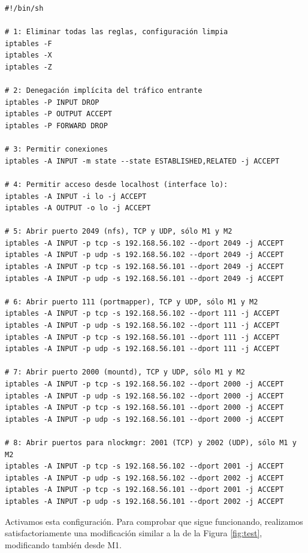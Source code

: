 \documentclass{article}
\begin{document}
\begin{Verbatim}
#!/bin/sh

# 1: Eliminar todas las reglas, configuración limpia
iptables -F
iptables -X
iptables -Z

# 2: Denegación implícita del tráfico entrante
iptables -P INPUT DROP
iptables -P OUTPUT ACCEPT
iptables -P FORWARD DROP

# 3: Permitir conexiones
iptables -A INPUT -m state --state ESTABLISHED,RELATED -j ACCEPT

# 4: Permitir acceso desde localhost (interface lo):
iptables -A INPUT -i lo -j ACCEPT
iptables -A OUTPUT -o lo -j ACCEPT

# 5: Abrir puerto 2049 (nfs), TCP y UDP, sólo M1 y M2
iptables -A INPUT -p tcp -s 192.168.56.102 --dport 2049 -j ACCEPT
iptables -A INPUT -p udp -s 192.168.56.102 --dport 2049 -j ACCEPT
iptables -A INPUT -p tcp -s 192.168.56.101 --dport 2049 -j ACCEPT
iptables -A INPUT -p udp -s 192.168.56.101 --dport 2049 -j ACCEPT

# 6: Abrir puerto 111 (portmapper), TCP y UDP, sólo M1 y M2
iptables -A INPUT -p tcp -s 192.168.56.102 --dport 111 -j ACCEPT
iptables -A INPUT -p udp -s 192.168.56.102 --dport 111 -j ACCEPT
iptables -A INPUT -p tcp -s 192.168.56.101 --dport 111 -j ACCEPT
iptables -A INPUT -p udp -s 192.168.56.101 --dport 111 -j ACCEPT

# 7: Abrir puerto 2000 (mountd), TCP y UDP, sólo M1 y M2
iptables -A INPUT -p tcp -s 192.168.56.102 --dport 2000 -j ACCEPT
iptables -A INPUT -p udp -s 192.168.56.102 --dport 2000 -j ACCEPT
iptables -A INPUT -p tcp -s 192.168.56.101 --dport 2000 -j ACCEPT
iptables -A INPUT -p udp -s 192.168.56.101 --dport 2000 -j ACCEPT

# 8: Abrir puertos para nlockmgr: 2001 (TCP) y 2002 (UDP), sólo M1 y M2
iptables -A INPUT -p tcp -s 192.168.56.102 --dport 2001 -j ACCEPT
iptables -A INPUT -p udp -s 192.168.56.102 --dport 2002 -j ACCEPT
iptables -A INPUT -p tcp -s 192.168.56.101 --dport 2001 -j ACCEPT
iptables -A INPUT -p udp -s 192.168.56.101 --dport 2002 -j ACCEPT
\end{Verbatim}

Activamos esta configuración. Para comprobar que sigue funcionando, realizamos satisfactoriamente una modificación similar a la de la Figura \ref{fig:test},
modificando también desde M1.
\end{document}
